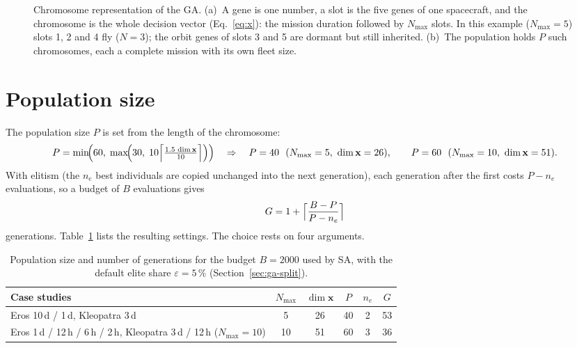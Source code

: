 \begin{figure}[htbp]
{%
}
\caption{Chromosome representation of the \ac{GA}. (a)~A gene is one number, a slot is the five
genes of one spacecraft, and the chromosome is the whole decision vector (Eq.~\ref{eq:x}): the
mission duration followed by $N_{\max}$ slots. In this example ($N_{\max}=5$) slots 1, 2 and 4 fly
($N=3$); the orbit genes of slots 3 and 5 are dormant but still inherited. (b)~The population holds
$P$ such chromosomes, each a complete mission with its own fleet size.}
\label{fig:chromosome}
\end{figure}

\section{Population size}
\label{sec:ga-popsize}

The population size $P$ is set from the length of the chromosome:
\begin{equation}
P=\min\!\Bigl(60,\;\max\!\Bigl(30,\;10\Bigl\lceil\tfrac{1.5\,\dim\mathbf{x}}{10}\Bigr\rceil\Bigr)\Bigr)
\quad\Rightarrow\quad
P=40\ \ (N_{\max}=5,\ \dim\mathbf{x}=26),\qquad P=60\ \ (N_{\max}=10,\ \dim\mathbf{x}=51).
\label{eq:popsize}
\end{equation}
With elitism (the $n_e$ best individuals are copied unchanged into the next generation), each
generation after the first costs $P-n_e$ evaluations, so a budget of $B$ evaluations gives
\begin{equation}
G = 1+\Bigl\lceil\frac{B-P}{P-n_e}\Bigr\rceil
\label{eq:generations}
\end{equation}
generations. Table~\ref{tab:popsize} lists the resulting settings. The choice rests on four
arguments.

\begin{table}[htbp]
\centering
\caption{Population size and number of generations for the budget $B=2000$ used by \ac{SA}, with
the default elite share $\varepsilon=5\,\%$ (Section~\ref{sec:ga-split}).}
\label{tab:popsize}
\begin{tabular}{@{}lccccc@{}}
\toprule
Case studies & $N_{\max}$ & $\dim\mathbf{x}$ & $P$ & $n_e$ & $G$ \\
\midrule
Eros 10\,d / 1\,d, Kleopatra 3\,d                           & 5  & 26 & 40 & 2 & 53 \\
Eros 1\,d / 12\,h / 6\,h / 2\,h, Kleopatra 3\,d / 12\,h ($N_{\max}=10$) & 10 & 51 & 60 & 3 & 36 \\
\bottomrule
\end{tabular}
\end{table}

